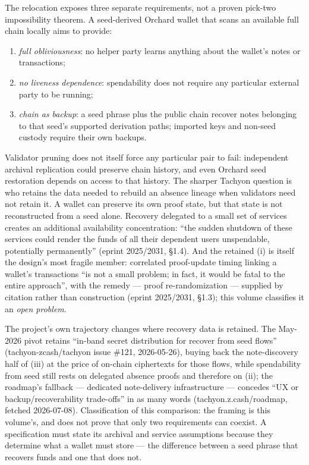 \documentclass[11pt,a4paper]{article}
\theoremstyle{definition}
\begin{document}
The relocation exposes three separate requirements, not a proven
pick-two impossibility theorem. A seed-derived Orchard wallet that scans
an available full chain locally aims to provide:
\begin{enumerate}[label=(\roman*)]
\item \emph{full obliviousness}: no helper party learns anything about the
  wallet's notes or transactions;
\item \emph{no liveness dependence}: spendability does not require any
  particular external party to be running;
\item \emph{chain as backup}: a seed phrase plus the public chain
  recover notes belonging to that seed's supported derivation paths;
  imported keys and non-seed custody require their own backups.
\end{enumerate}
Validator pruning does not itself force any particular pair to fail:
independent archival replication could preserve chain history, and even
Orchard seed restoration depends on access to that history. The sharper
Tachyon question is who retains the data needed to rebuild an absence
lineage when validators need not retain it. A wallet can preserve its own
proof state, but that state is not reconstructed from a seed alone.
Recovery delegated to a small set of services creates an additional
availability concentration: ``the sudden shutdown of these services could render
the funds of all their dependent users unspendable, potentially
permanently'' (eprint 2025/2031, \S1.4). And the retained (i) is itself the
design's most fragile member: correlated proof-update timing linking a
wallet's transactions ``is not a small problem; in fact, it would be fatal
to the entire approach'', with the remedy --- proof re-randomization ---
supplied by citation rather than construction (eprint 2025/2031, \S1.3);
this volume classifies it an \emph{open problem}.

The project's own trajectory changes where recovery data is retained.
The May-2026 pivot retains ``in-band secret distribution for recover
from seed flows'' (tachyon-zcash/tachyon issue \#121, 2026-05-26), buying
back the note-discovery half of (iii) at the price of on-chain ciphertexts
for those flows, while spendability from seed still rests on delegated
absence proofs and therefore on (ii); the roadmap's fallback --- dedicated
note-delivery infrastructure --- concedes ``UX or backup/recoverability
trade-offs'' in as many words (tachyon.z.cash/roadmap, fetched 2026-07-08).
Classification of this comparison: the framing is this volume's, and
does not prove that only two requirements can coexist. A specification
must state its archival and service assumptions because they determine
what a wallet must store ---
the difference between a seed phrase that recovers funds and one that does
not.
\end{document}
